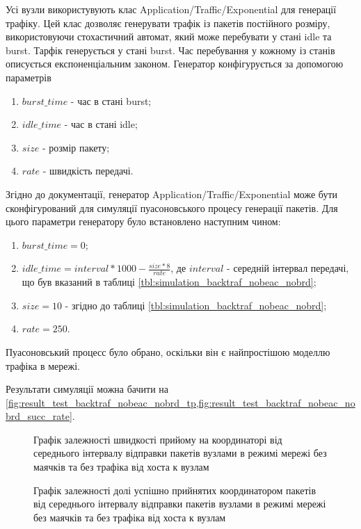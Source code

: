 \documentclass[a4paper,ukrainian,utf8,nocolumnsxix,floatsection,equationsection]{eskdtext}
\begin{document}
Усі вузли використувують клас Application/Traffic/Exponential для генерації трафіку. Цей клас дозволяє генерувати трафік із пакетів постійного розміру, використовуючи стохастичний автомат, який може перебувати у стані idle та burst. Тарфік генерується у стані burst. Час перебування у кожному із станів описується експоненціальним законом. Генератор конфігурується за допомогою параметрів 
\begin{enumerate}
	\item $burst\_time$ - час в стані burst;
	\item $idle\_time$ - час в стані idle;
	\item $size$ - розмір пакету;
	\item $rate$ - швидкість передачі.
\end{enumerate}

Згідно до документації, генератор Application/Traffic/Exponential може бути сконфігурований для симуляції пуасоновського процесу генерації пакетів. Для цього параметри генератору було встановлено наступним чином:
\begin{enumerate}
	\item $burst\_time = 0$;
	\item $idle\_time = interval*1000 - \frac{size*8}{rate}$, де $interval$ - середній інтервал передачі, що був вказаний в таблиці \ref{tbl:simulation_backtraf_nobeac_nobrd};
	\item $size = 10$ - згідно до таблиці \ref{tbl:simulation_backtraf_nobeac_nobrd};
	\item $rate = 250$.
\end{enumerate}

Пуасоновський процесс було обрано, оскільки він є найпростішою моделлю трафіка в мережі.

Результати симуляції можна бачити на \cref{fig:result_test_backtraf_nobeac_nobrd_tp,fig:result_test_backtraf_nobeac_nobrd_succ_rate}.

\begin{figure}[h]
	\centering
	\caption{\label{fig:result_test_backtraf_nobeac_nobrd_tp}Графік залежності швидкості прийому на координаторі від середнього інтервалу відправки пакетів вузлами в режимі мережі без маячків та без трафіка від хоста к вузлам}
\end{figure}

\begin{figure}[h]
	\centering
	\caption{\label{fig:result_test_backtraf_nobeac_nobrd_succ_rate}Графік залежності долі успішно прийнятих координатором пакетів від середнього інтервалу відправки пакетів вузлами в режимі мережі без маячків та без трафіка від хоста к вузлам}
\end{figure}
\end{document}
